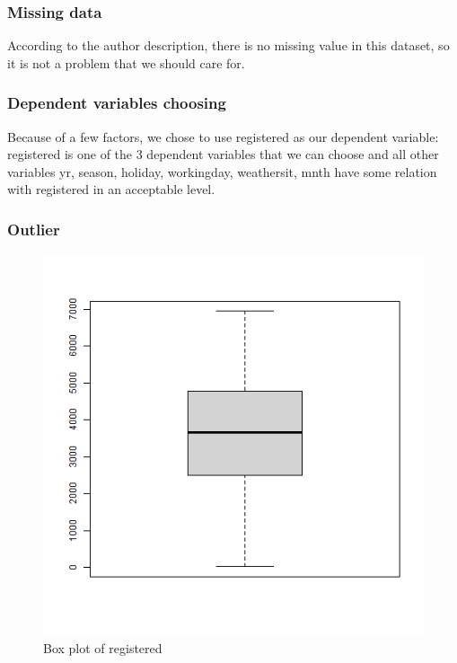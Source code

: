 \subsubsection{Missing data}

According to the author description, there is no missing value in this dataset, so it is not a problem that we should care for.

\subsubsection{Dependent variables choosing}

Because of a few factors, we chose to use registered as our dependent variable: registered is one of the 3 dependent variables that we can choose and all other variables yr, season, holiday, workingday, weathersit, mnth have some relation with registered in an acceptable level.

\subsubsection{Outlier}

\begin{figure}[H]
\centering
\includegraphics[scale=.4]{img/registered_box_plot.png}
\caption{Box plot of registered}
\label{fig:registered_box_plot}
\end{figure}


